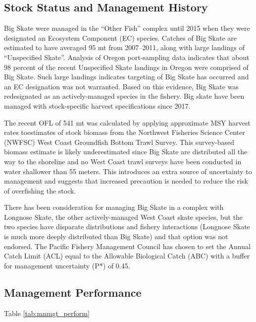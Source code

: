 \documentclass[12pt,]{article}
\begin{document}
\hypertarget{stock-status-and-management-history}{%
\subsection{Stock Status and Management
History}\label{stock-status-and-management-history}}

Big Skate were managed in the ``Other Fish'' complex until 2015 when
they were designated an Ecosystem Component (EC) species. Catches of Big
Skate are estimated to have averaged 95 mt from 2007--2011, along with
large landings of ``Unspecified Skate''. Analysis of Oregon
port-sampling data indicates that about 98 percent of the recent
Unspecified Skate landings in Oregon were comprised of Big Skate. Such
large landings indicates targeting of Big Skate has occurred and an EC
designation was not warranted. Based on this evidence, Big Skate was
redesignated as an actively-managed species in the fishery. Big skate
have been managed with stock-specific harvest specifications since 2017.

The recent OFL of 541 mt was calculated by applying approximate MSY
harvest rates toestimates of stock biomass from the Northwest Fisheries
Science Center (NWFSC) West Coast Groundfish Bottom Trawl Survey. This
survey-based biomass estimate is likely underestimated since Big Skate
are distributed all the way to the shoreline and no West Coast trawl
surveys have been conducted in water shallower than 55 meters. This
introduces an extra source of uncertainty to management and suggests
that increased precaution is needed to reduce the risk of overfishing
the stock.

There has been consideration for managing Big Skate in a complex with
Longnose Skate, the other actively-managed West Coast skate species, but
the two species have disparate distributions and fishery interactions
(Longnose Skate is much more deeply distributed than Big Skate) and that
option was not endorsed. The Pacific Fishery Management Council has
chosen to set the Annual Catch Limit (ACL) equal to the Allowable
Biological Catch (ABC) with a buffer for management uncertainty (P*) of
0.45.

\hypertarget{management-performance-1}{%
\subsection{Management Performance}\label{management-performance-1}}

Table \ref{tab:mnmgt_perform}
\end{document}
